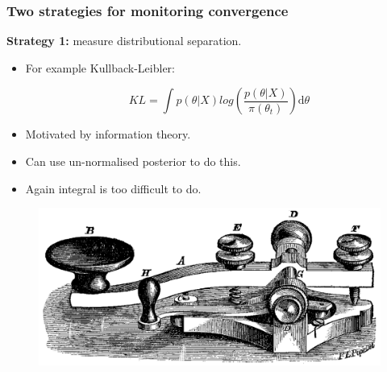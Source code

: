 \documentclass[handout]{beamer}
\begin{document}
\begin{frame}
\frametitle{Two strategies for monitoring convergence}

\textbf{Strategy 1:} measure distributional separation.
\begin{itemize}
\item<3-> For example Kullback-Leibler:

\begin{equation}
KL=\int p(\theta|X) log\left(\frac{p(\theta|X)}{\pi(\theta_t)}\right) \mathrm{d}\theta
\end{equation}

\item<5-> Motivated by information theory.
\item<6-> Can use un-normalised posterior to do this.
\item<7-> Again integral is too difficult to do.
\end{itemize}

\begin{figure}[ht]
\centerline{\includegraphics[width=1\textwidth]{animations_figures/morse.pdf}}
\end{figure}

\end{frame}
\end{document}
